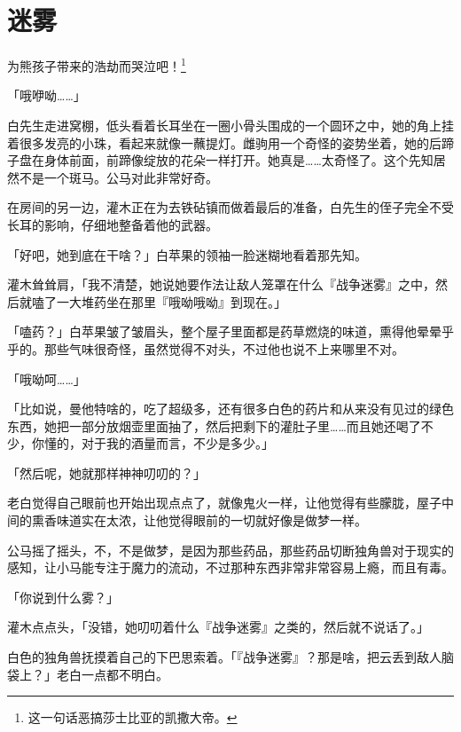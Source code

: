 \chapter{迷雾}


\begin{intro}
    为熊孩子带来的浩劫而哭泣吧！\footnotespacefix\footnote{这一句话恶搞莎士比亚的凯撒大帝。}
\end{intro}


「哦咿呦……」

白先生走进窝棚，低头看着长耳坐在一圈小骨头围成的一个圆环之中，她的角上挂着很多发亮的小珠，看起来就像一蘸提灯。雌驹用一个奇怪的姿势坐着，她的后蹄子盘在身体前面，前蹄像绽放的花朵一样打开。她真是……太奇怪了。这个先知居然不是一个斑马。公马对此非常好奇。

在房间的另一边，灌木正在为去铁砧镇而做着最后的准备，白先生的侄子完全不受长耳的影响，仔细地整备着他的武器。

「好吧，她到底在干啥？」白苹果的领袖一脸迷糊地看着那先知。

灌木耸耸肩，「我不清楚，她说她要作法让敌人笼罩在什么『战争迷雾』之中，然后就嗑了一大堆药坐在那里『哦呦哦呦』到现在。」

「嗑药？」白苹果皱了皱眉头，整个屋子里面都是药草燃烧的味道，熏得他晕晕乎乎的。那些气味很奇怪，虽然觉得不对头，不过他也说不上来哪里不对。

「哦呦呵……」

「比如说，曼他特啥的，吃了超级多，还有很多白色的药片和从来没有见过的绿色东西，她把一部分放烟壶里面抽了，然后把剩下的灌肚子里……而且她还喝了不少，你懂的，对于我的酒量而言，不少是多少。」

「然后呢，她就那样神神叨叨的？」

老白觉得自己眼前也开始出现点点了，就像鬼火一样，让他觉得有些朦胧，屋子中间的熏香味道实在太浓，让他觉得眼前的一切就好像是做梦一样。

公马摇了摇头，不，不是做梦，是因为那些药品，那些药品切断独角兽对于现实的感知，让小马能专注于魔力的流动，不过那种东西非常非常容易上瘾，而且有毒。

「你说到什么雾？」

灌木点点头，「没错，她叨叨着什么『战争迷雾』之类的，然后就不说话了。」

白色的独角兽抚摸着自己的下巴思索着。「『战争迷雾』？那是啥，把云丢到敌人脑袋上？」老白一点都不明白。

